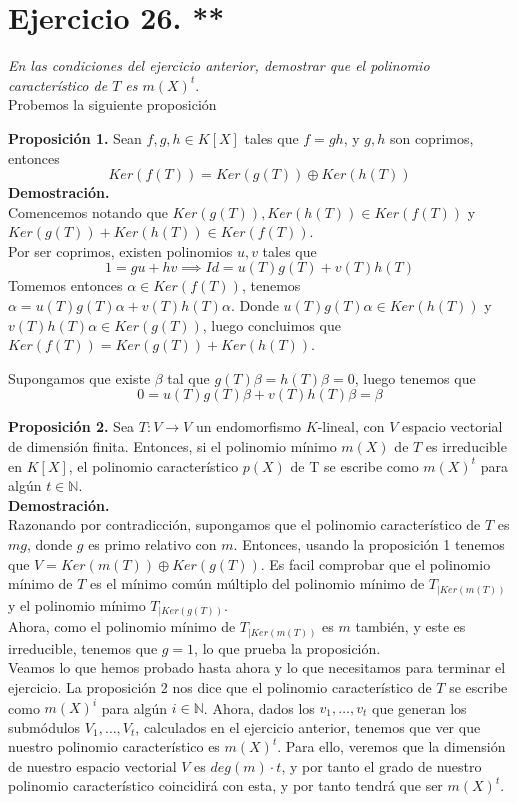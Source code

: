 \section{Ejercicio 26. **} \textit{En las condiciones del ejercicio anterior,
  demostrar que el polinomio característico de \(T\) es \(m(X)^t\)}.\\

Probemos la siguiente proposición

\textbf{Proposición 1. }Sean \(f,g,h \in K[X]\) tales que \(f = gh\), y \(g,h\) son
coprimos, entonces
\[
  Ker(f(T)) = Ker(g(T)) \oplus Ker(h(T))
\]
\textbf{Demostración.}\\
Comencemos notando que \(Ker(g(T)), Ker(h(T)) \in Ker(f(T))\) y \(Ker(g(T)) +
Ker(h(T)) \in Ker(f(T))\).\\ Por ser coprimos, existen polinomios \(u,v\) tales
que
\[
  1 = gu + hv \implies Id = u(T)g(T) + v(T)h(T)
\]
Tomemos entonces \(\alpha \in Ker(f(T))\), tenemos \(\alpha = u(T)g(T)\alpha +
v(T)h(T)\alpha\).
Donde  \( u(T)g(T)\alpha \in Ker(h(T))\) y  \( v(T)h(T)\alpha \in Ker(g(T))\),
luego concluimos que \(Ker(f(T)) = Ker(g(T)) + Ker(h(T))\).

Supongamos que existe \(\beta\) tal que \(g(T)\beta = h(T)\beta = 0\), luego
tenemos que
\[
  0 = u(T)g(T)\beta + v(T)h(T)\beta = \beta
\]

\textbf{Proposición 2.} Sea \(T: V \rightarrow V \) un endomorfismo \(K\)-lineal, con \(V\) espacio vectorial de dimensión finita. Entonces, si el polinomio mínimo \(m(X)\) de  \(T\) es irreducible en  \(K[X]\), el polinomio característico \(p(X)\) de T se escribe como \(m(X)^t\) para algún \(t \in \mathbb{N}\).\\

\textbf{Demostración.}\\
Razonando por contradicción, supongamos que el polinomio característico de \(T\) es  \(mg\), donde  \(g\) es primo relativo con \(m\). Entonces, usando la proposición 1 tenemos que \(V = Ker(m(T)) \oplus Ker(g(T))\). Es facil comprobar que el polinomio mínimo de \(T\) es el mínimo común múltiplo del polinomio mínimo de \(T_{|Ker(m(T))}\) y el polinomio mínimo \(T_{|Ker(g(T))}\).\\

Ahora, como el polinomio mínimo de \(T_{|Ker(m(T))}\) es \(m\) también, y este es irreducible, tenemos que \(g = 1\), lo que prueba la proposición.\\

Veamos lo que hemos probado hasta ahora y lo que necesitamos para terminar el ejercicio. La proposición 2 nos dice que el polinomio característico de \(T\) se escribe como \(m(X)^i\) para algún \(i \in \mathbb{N}\). Ahora, dados los \(v_1, \dots, v_t\) que generan los submódulos \(V_1, \dots, V_t\), calculados en el ejercicio anterior, tenemos que ver que nuestro polinomio característico es \(m(X)^t\). Para ello, veremos que la dimensión de nuestro espacio vectorial \(V\) es  \(deg(m) \cdot t\), y por tanto el grado de nuestro polinomio característico coincidirá con esta, y por tanto tendrá que ser \(m(X)^t\).\\


